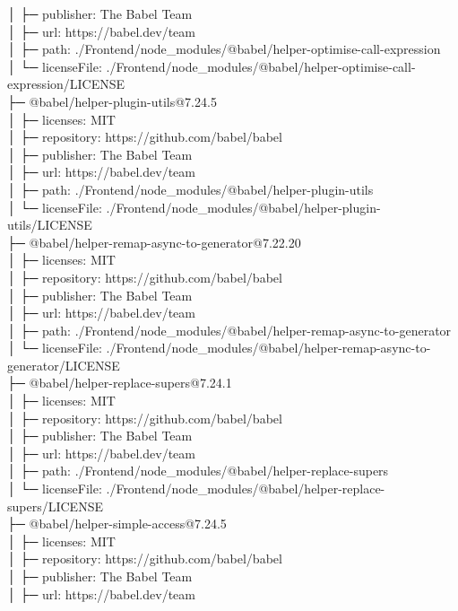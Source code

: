 │  ├─ publisher: The Babel Team\\
│  ├─ url: https://babel.dev/team\\
│  ├─ path: ./Frontend/node\_modules/@babel/helper-optimise-call-expression\\
│  └─ licenseFile: ./Frontend/node\_modules/@babel/helper-optimise-call-expression/LICENSE\\
├─ @babel/helper-plugin-utils@7.24.5\\
│  ├─ licenses: MIT\\
│  ├─ repository: https://github.com/babel/babel\\
│  ├─ publisher: The Babel Team\\
│  ├─ url: https://babel.dev/team\\
│  ├─ path: ./Frontend/node\_modules/@babel/helper-plugin-utils\\
│  └─ licenseFile: ./Frontend/node\_modules/@babel/helper-plugin-utils/LICENSE\\
├─ @babel/helper-remap-async-to-generator@7.22.20\\
│  ├─ licenses: MIT\\
│  ├─ repository: https://github.com/babel/babel\\
│  ├─ publisher: The Babel Team\\
│  ├─ url: https://babel.dev/team\\
│  ├─ path: ./Frontend/node\_modules/@babel/helper-remap-async-to-generator\\
│  └─ licenseFile: ./Frontend/node\_modules/@babel/helper-remap-async-to-generator/LICENSE\\
├─ @babel/helper-replace-supers@7.24.1\\
│  ├─ licenses: MIT\\
│  ├─ repository: https://github.com/babel/babel\\
│  ├─ publisher: The Babel Team\\
│  ├─ url: https://babel.dev/team\\
│  ├─ path: ./Frontend/node\_modules/@babel/helper-replace-supers\\
│  └─ licenseFile: ./Frontend/node\_modules/@babel/helper-replace-supers/LICENSE\\
├─ @babel/helper-simple-access@7.24.5\\
│  ├─ licenses: MIT\\
│  ├─ repository: https://github.com/babel/babel\\
│  ├─ publisher: The Babel Team\\
│  ├─ url: https://babel.dev/team\\
